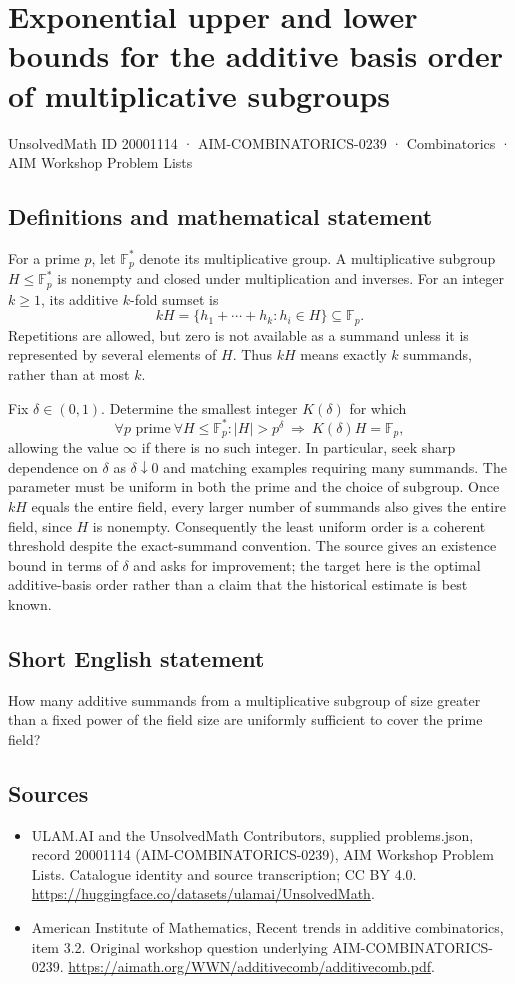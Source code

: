 \documentclass[11pt,a4paper]{article}
\begin{document}
\section*{Exponential upper and lower bounds for the additive basis order of multiplicative subgroups}\label{20001114}
{\small UnsolvedMath ID 20001114 · AIM-COMBINATORICS-0239 · Combinatorics · AIM Workshop Problem Lists}
\subsection{Definitions and mathematical statement}
For a prime $p$, let $\mathbb F_p^*$ denote its multiplicative group.
A multiplicative subgroup $H\leq\mathbb F_p^*$ is nonempty and closed under multiplication and inverses.
For an integer $k\geq1$, its additive $k$-fold sumset is
\[
 kH=\{h_1+\cdots+h_k:h_i\in H\}\subseteq\mathbb F_p.
\]
Repetitions are allowed, but zero is not available as a summand unless it is represented by several elements of $H$.
Thus $kH$ means exactly $k$ summands, rather than at most $k$.

Fix $\delta\in(0,1)$.
Determine the smallest integer $K(\delta)$ for which
\[
 \forall p\text{ prime}\ \forall H\leq\mathbb F_p^*:
       |H|>p^\delta\ \Longrightarrow\ K(\delta)H=\mathbb F_p,
\]
allowing the value $\infty$ if there is no such integer.
In particular, seek sharp dependence on $\delta$ as $\delta\downarrow0$ and matching examples requiring many summands.
The parameter must be uniform in both the prime and the choice of subgroup.
Once $kH$ equals the entire field, every larger number of summands also gives the entire field, since $H$ is nonempty.
Consequently the least uniform order is a coherent threshold despite the exact-summand convention.
The source gives an existence bound in terms of $\delta$ and asks for improvement; the target here is the optimal additive-basis order rather than a claim that the historical estimate is best known.
\subsection{Short English statement}
How many additive summands from a multiplicative subgroup of size greater than a fixed power of the field size are uniformly sufficient to cover the prime field?
\subsection{Sources}
\begin{itemize}
\item[S1] ULAM.AI and the UnsolvedMath Contributors, supplied problems.json, record 20001114 (AIM-COMBINATORICS-0239), AIM Workshop Problem Lists. Catalogue identity and source transcription; CC BY 4.0.
\url{https://huggingface.co/datasets/ulamai/UnsolvedMath}.
\item[S2] American Institute of Mathematics, Recent trends in additive combinatorics, item 3.2. Original workshop question underlying AIM-COMBINATORICS-0239.
\url{https://aimath.org/WWN/additivecomb/additivecomb.pdf}.
\end{itemize}
\end{document}
